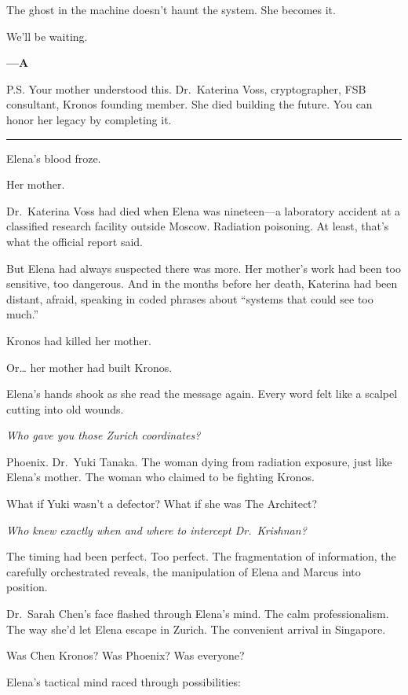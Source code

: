 The ghost in the machine doesn't haunt the system. She becomes it.

We'll be waiting.

\textbf{---A}

P.S. Your mother understood this. Dr.~Katerina Voss, cryptographer, FSB
consultant, Kronos founding member. She died building the future. You
can honor her legacy by completing it.

\begin{center}\rule{0.5\linewidth}{0.5pt}\end{center}

Elena's blood froze.

Her mother.

Dr.~Katerina Voss had died when Elena was nineteen---a laboratory
accident at a classified research facility outside Moscow. Radiation
poisoning. At least, that's what the official report said.

But Elena had always suspected there was more. Her mother's work had
been too sensitive, too dangerous. And in the months before her death,
Katerina had been distant, afraid, speaking in coded phrases about
``systems that could see too much.''

Kronos had killed her mother.

Or\ldots{} her mother had built Kronos.

Elena's hands shook as she read the message again. Every word felt like
a scalpel cutting into old wounds.

\emph{Who gave you those Zurich coordinates?}

Phoenix. Dr.~Yuki Tanaka. The woman dying from radiation exposure, just
like Elena's mother. The woman who claimed to be fighting Kronos.

What if Yuki wasn't a defector? What if she was The Architect?

\emph{Who knew exactly when and where to intercept Dr.~Krishnan?}

The timing had been perfect. Too perfect. The fragmentation of
information, the carefully orchestrated reveals, the manipulation of
Elena and Marcus into position.

Dr.~Sarah Chen's face flashed through Elena's mind. The calm
professionalism. The way she'd let Elena escape in Zurich. The
convenient arrival in Singapore.

Was Chen Kronos? Was Phoenix? Was everyone?

Elena's tactical mind raced through possibilities:

